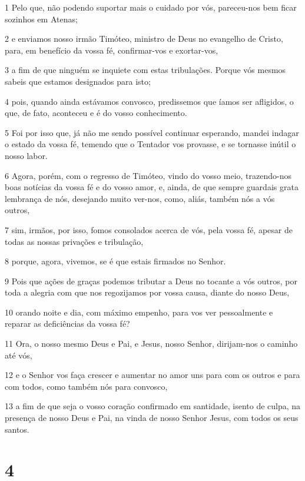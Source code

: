 \par 1 Pelo que, não podendo suportar mais o cuidado por vós, pareceu-nos bem ficar sozinhos em Atenas;
\par 2 e enviamos nosso irmão Timóteo, ministro de Deus no evangelho de Cristo, para, em benefício da vossa fé, confirmar-vos e exortar-vos,
\par 3 a fim de que ninguém se inquiete com estas tribulações. Porque vós mesmos sabeis que estamos designados para isto;
\par 4 pois, quando ainda estávamos convosco, predissemos que íamos ser afligidos, o que, de fato, aconteceu e é do vosso conhecimento.
\par 5 Foi por isso que, já não me sendo possível continuar esperando, mandei indagar o estado da vossa fé, temendo que o Tentador vos provasse, e se tornasse inútil o nosso labor.
\par 6 Agora, porém, com o regresso de Timóteo, vindo do vosso meio, trazendo-nos boas notícias da vossa fé e do vosso amor, e, ainda, de que sempre guardais grata lembrança de nós, desejando muito ver-nos, como, aliás, também nós a vós outros,
\par 7 sim, irmãos, por isso, fomos consolados acerca de vós, pela vossa fé, apesar de todas as nossas privações e tribulação,
\par 8 porque, agora, vivemos, se é que estais firmados no Senhor.
\par 9 Pois que ações de graças podemos tributar a Deus no tocante a vós outros, por toda a alegria com que nos regozijamos por vossa causa, diante do nosso Deus,
\par 10 orando noite e dia, com máximo empenho, para vos ver pessoalmente e reparar as deficiências da vossa fé?
\par 11 Ora, o nosso mesmo Deus e Pai, e Jesus, nosso Senhor, dirijam-nos o caminho até vós,
\par 12 e o Senhor vos faça crescer e aumentar no amor uns para com os outros e para com todos, como também nós para convosco,
\par 13 a fim de que seja o vosso coração confirmado em santidade, isento de culpa, na presença de nosso Deus e Pai, na vinda de nosso Senhor Jesus, com todos os seus santos.

\chapter{4}

